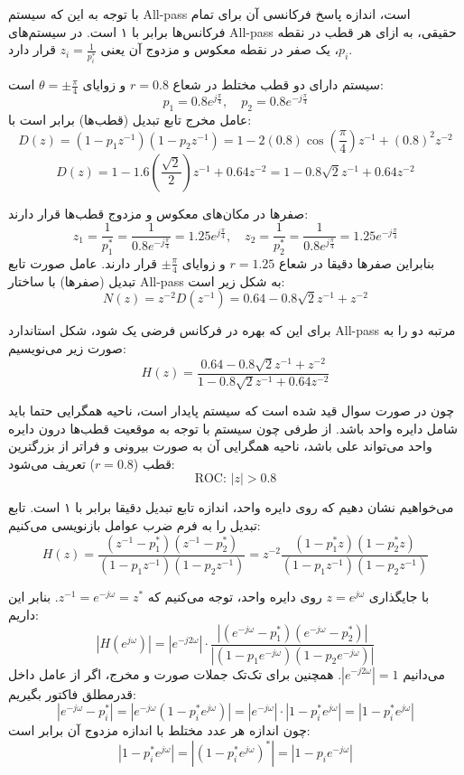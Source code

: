 
با توجه به این که سیستم All-pass است، اندازه پاسخ فرکانسی آن برای تمام فرکانس‌ها برابر با ۱ است. در سیستم‌های All-pass حقیقی، به ازای هر قطب در نقطه $p_i$، یک صفر در نقطه معکوس و مزدوج آن یعنی $z_i = \frac{1}{p_i^*}$ قرار دارد.

سیستم دارای دو قطب مختلط در شعاع $r = 0.8$ و زوایای $\theta = \pm \frac{\pi}{4}$ است:
    \[
    p_1 = 0.8 e^{j \frac{\pi}{4}}, \quad p_2 = 0.8 e^{-j \frac{\pi}{4}}
    \]
    عامل مخرج تابع تبدیل (قطب‌ها) برابر است با:
    \[
    D(z) = (1 - p_1 z^{-1})(1 - p_2 z^{-1}) = 1 - 2(0.8)\cos\left(\frac{\pi}{4}\right)z^{-1} + (0.8)^2 z^{-2}
    \]
    \[
    D(z) = 1 - 1.6 \left(\frac{\sqrt{2}}{2}\right)z^{-1} + 0.64 z^{-2} = 1 - 0.8\sqrt{2}z^{-1} + 0.64 z^{-2}
    \]

صفرها در مکان‌های معکوس و مزدوج قطب‌ها قرار دارند:
    \[
    z_1 = \frac{1}{p_1^*} = \frac{1}{0.8 e^{-j \frac{\pi}{4}}} = 1.25 e^{j \frac{\pi}{4}}, \quad z_2 = \frac{1}{p_2^*} = \frac{1}{0.8 e^{j \frac{\pi}{4}}} = 1.25 e^{-j \frac{\pi}{4}}
    \]
    بنابراین صفرها دقیقا در شعاع $r = 1.25$ و زوایای $\pm \frac{\pi}{4}$ قرار دارند. عامل صورت تابع تبدیل (صفرها) با ساختار All-pass به شکل زیر است:
    \[
    N(z) = z^{-2} D(z^{-1}) = 0.64 - 0.8\sqrt{2}z^{-1} + z^{-2}
    \]

برای این که بهره در فرکانس فرضی یک شود، شکل استاندارد All-pass مرتبه دو را به صورت زیر می‌نویسیم:
\[
H(z) = \frac{0.64 - 0.8\sqrt{2}z^{-1} + z^{-2}}{1 - 0.8\sqrt{2}z^{-1} + 0.64 z^{-2}}
\]

چون در صورت سوال قید شده است که سیستم {پایدار} است، ناحیه همگرایی حتما باید شامل دایره واحد باشد. از طرفی چون سیستم با توجه به موقعیت قطب‌ها درون دایره واحد می‌تواند علی باشد، ناحیه همگرایی آن به صورت بیرونی و فراتر از بزرگترین قطب ($r = 0.8$) تعریف می‌شود:
\[
\text{ROC: } |z| > 0.8
\]


می‌خواهیم نشان دهیم که روی دایره واحد، اندازه تابع تبدیل دقیقا برابر با ۱ است. 
تابع تبدیل را به فرم ضرب عوامل بازنویسی می‌کنیم:
\[
H(z) = \frac{(z^{-1} - p_1^*)(z^{-1} - p_2^*)}{(1 - p_1 z^{-1})(1 - p_2 z^{-1})} = z^{-2} \frac{(1 - p_1^* z)(1 - p_2^* z)}{(1 - p_1 z^{-1})(1 - p_2 z^{-1})}
\]

با جایگذاری $z = e^{j\omega}$ روی دایره واحد، توجه می‌کنیم که $z^{-1} = e^{-j\omega} = z^*$. بنابر این داریم:
\[
|H(e^{j\omega})| = |e^{-j2\omega}| \cdot \frac{|(e^{-j\omega} - p_1^*)(e^{-j\omega} - p_2^*)|}{|(1 - p_1 e^{-j\omega})(1 - p_2 e^{-j\omega})|}
\]
می‌دانیم $|e^{-j2\omega}| = 1$. همچنین برای تک‌تک جملات صورت و مخرج، اگر از عامل داخل قدرمطلق فاکتور بگیریم:
\[
|e^{-j\omega} - p_i^*| = |e^{-j\omega}(1 - p_i^* e^{j\omega})| = |e^{-j\omega}| \cdot |1 - p_i^* e^{j\omega}| = |1 - p_i^* e^{j\omega}|
\]
چون اندازه هر عدد مختلط با اندازه مزدوج آن برابر است:
\[
|1 - p_i^* e^{j\omega}| = |(1 - p_i^* e^{j\omega})^*| = |1 - p_i e^{-j\omega}|
\]

